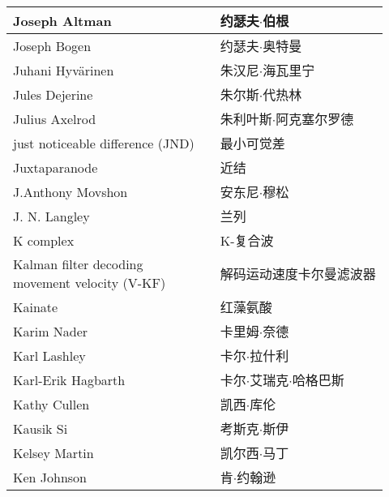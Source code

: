 \begin{longtable}{lll}
	\midrule
	Joseph Altman   && 约瑟夫$\cdot$伯根  \\
	
	\midrule
	Joseph Bogen   && 约瑟夫$\cdot$奥特曼  \\
	
	\midrule
	Juhani Hyvärinen   && 朱汉尼$\cdot$海瓦里宁  \\
	
	\midrule
	Jules Dejerine   && 朱尔斯$\cdot$代热林  \\
	
	\midrule
	Julius Axelrod   && 朱利叶斯$\cdot$阿克塞尔罗德  \\
	
	\midrule
	just noticeable difference (JND)   && 最小可觉差  \\
	
	\midrule
	Juxtaparanode   && 近结  \\
	
	\midrule
	J.Anthony Movshon   && 安东尼$\cdot$穆松  \\
	
	\midrule
	J. N. Langley   && 兰列  \\
	
	\midrule
	K complex   && K-复合波  \\
	
	\midrule
	\makecell[l]{Kalman filter decoding \\movement velocity (V-KF)}   && 解码运动速度卡尔曼滤波器  \\
	
	\midrule
	Kainate   && 红藻氨酸  \\
	
	\midrule
	Karim Nader   && 卡里姆$\cdot$奈德  \\
	
	\midrule
	Karl Lashley  && 卡尔$\cdot$拉什利  \\
	
	\midrule
	Karl-Erik Hagbarth  && 卡尔$\cdot$艾瑞克$\cdot$哈格巴斯  \\
	
	\midrule
	Kathy Cullen  && 凯西$\cdot$库伦  \\
	
	\midrule
	Kausik Si  && 考斯克$\cdot$斯伊  \\
	
	\midrule
	Kelsey Martin   && 凯尔西$\cdot$马丁  \\
	
	\midrule
	Ken Johnson   && 肯$\cdot$约翰逊  \\
	

\end{longtable}
